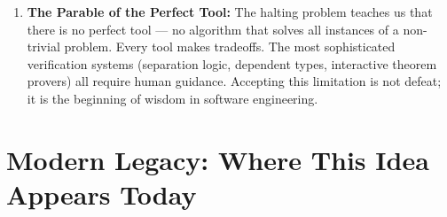\begin{enumerate}
\item \textbf{The Parable of the Perfect Tool:} The halting problem teaches us that there is no perfect tool — no algorithm that solves all instances of a non-trivial problem. Every tool makes tradeoffs. The most sophisticated verification systems (separation logic, dependent types, interactive theorem provers) all require human guidance. Accepting this limitation is not defeat; it is the beginning of wisdom in software engineering.
\end{enumerate}

\section{Modern Legacy: Where This Idea Appears Today}
\label{sec:halting:legacy}


